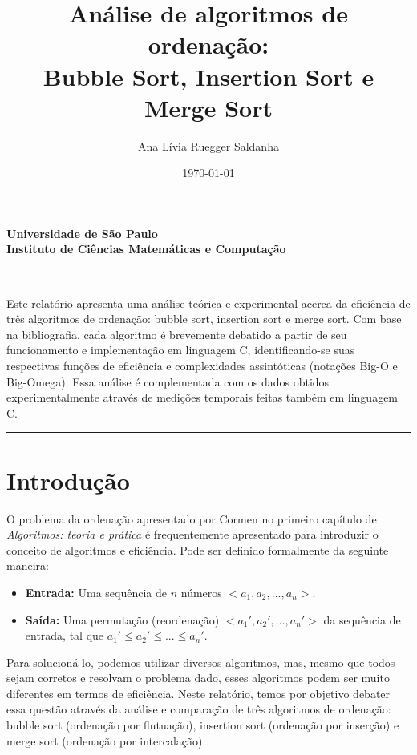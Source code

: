 \documentclass[fontsize=10pt]{article}
\title{\Large{Análise de algoritmos de ordenação: \\ [-6pt] Bubble Sort, Insertion Sort e Merge Sort} \\ [10pt]}
\author{Ana Lívia Ruegger Saldanha}
\date{\today}
\makeatletter
\renewenvironment{abstract} %
 {\small
  \begin{center}
  \bfseries \abstractname\vspace{-.5em}\vspace{0pt}
  \end{center}
  \list{}{%
    \setlength{\leftmargin}{0mm}
    \setlength{\rightmargin}{\leftmargin}%
  }
  \item\relax}
 {\endlist}
\renewcommand{\maketitle}{\bgroup\setlength{\parindent}{0pt}%
\begin{center}
    \textbf{
      Universidade de São Paulo\\
      Instituto de Ciências Matemáticas e Computação
    }
\end{center}
\begin{center}
  \textbf{\@title}
  \@author\\
  [3pt] 
  \@date
\end{center}\egroup
}
\makeatother
\begin{document}
\maketitle


\begin{abstract}
    Este relatório apresenta uma análise teórica e experimental acerca da eficiência de três algoritmos de ordenação: bubble sort, insertion sort e merge sort. Com base na bibliografia, cada algoritmo é brevemente debatido a partir de seu funcionamento e implementação em linguagem C, identificando-se suas respectivas funções de eficiência e complexidades assintóticas (notações Big-O e Big-Omega). Essa análise é complementada com os dados obtidos experimentalmente através de medições temporais feitas também em linguagem C.
    
\end{abstract}

\rule{\linewidth}{0.5pt}

\section{Introdução}
    
    \quad O problema da ordenação apresentado por Cormen no primeiro capítulo de \textit{Algoritmos: teoria e prática} \cite{cormen} é frequentemente apresentado para introduzir o conceito de algoritmos e eficiência. Pode ser definido formalmente da seguinte maneira:
    
    \begin{itemize}
        \item \textbf{Entrada:} Uma sequência de $n$ números $<a_1, a_2, ..., a_n>$.
        \item \textbf{Saída:} Uma permutação (reordenação) $<a_1', a_2', ..., a_n'>$ da sequência de entrada, tal que $a_1' \leq a_2' \leq ... \leq a_n'$.
    \end{itemize}
    
    \quad Para solucioná-lo, podemos utilizar diversos algoritmos, mas, mesmo que todos sejam corretos e resolvam o problema dado, esses algoritmos podem ser muito diferentes em termos de eficiência. Neste relatório, temos por objetivo debater essa questão através da análise e comparação de três algoritmos de ordenação: bubble sort (ordenação por flutuação), insertion sort (ordenação por inserção) e merge sort (ordenação por intercalação). 
    
\end{document}
